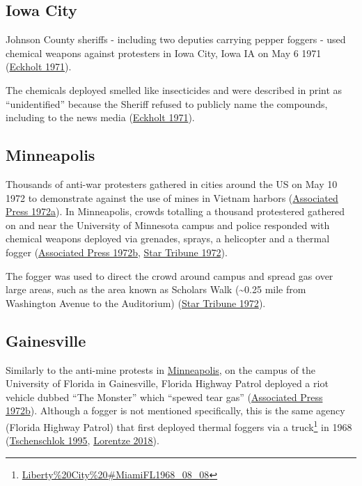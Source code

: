\documentclass[
  11pt,
]{krantz}
\renewcommand{\href}[2]{#2\footnote{\url{#1}}}
\begin{document}
\hypertarget{IowaCity}{%
\subsection{Iowa City}\label{IowaCity}}

Johnson County sheriffs - including two deputies carrying pepper foggers - used chemical weapons against protesters in Iowa City, Iowa IA on May 6 1971 (\protect\hyperlink{ref-Eckholt1971}{Eckholt 1971}).

The chemicals deployed smelled like insecticides and were described in print as ``unidentified'' because the Sheriff refused to publicly name the compounds, including to the news media (\protect\hyperlink{ref-Eckholt1971}{Eckholt 1971}).

\hypertarget{Minneapolis1972_05_10}{%
\subsection{Minneapolis}\label{Minneapolis1972_05_10}}

Thousands of anti-war protesters gathered in cities around the US on May 10 1972 to demonstrate against the use of mines in Vietnam harbors (\protect\hyperlink{ref-ArgusLeader1972_05_11a}{Associated Press 1972a}).
In Minneapolis, crowds totalling a thousand protestered gathered on and near the University of Minnesota campus and police responded with chemical weapons deployed via grenades, sprays, a helicopter and a thermal fogger (\protect\hyperlink{ref-ArgusLeader1972_05_11b}{Associated Press 1972b}, \protect\hyperlink{ref-StarTribune1972_05_11}{Star Tribune 1972}).

The fogger was used to direct the crowd around campus and spread gas over large areas, such as the area known as Scholars Walk (\textasciitilde0.25 mile from Washington Avenue to the Auditorium) (\protect\hyperlink{ref-StarTribune1972_05_11}{Star Tribune 1972}).

\hypertarget{gainesville}{%
\subsection{Gainesville}\label{gainesville}}

Similarly to the anti-mine protests in \protect\hyperlink{Minneapolis1972_05_10}{Minneapolis}, on the campus of the University of Florida in Gainesville, Florida Highway Patrol deployed a riot vehicle dubbed ``The Monster'' which ``spewed tear gas'' (\protect\hyperlink{ref-ArgusLeader1972_05_11b}{Associated Press 1972b}).
Although a fogger is not mentioned specifically, this is the same agency (Florida Highway Patrol) that first \href{Liberty\%20City\%20\#MiamiFL1968_08_08}{deployed thermal foggers via a truck} in 1968 (\protect\hyperlink{ref-Tschenschlok1995}{Tschenschlok 1995}, \protect\hyperlink{ref-Lorentzen2018}{Lorentze 2018}).
\end{document}
